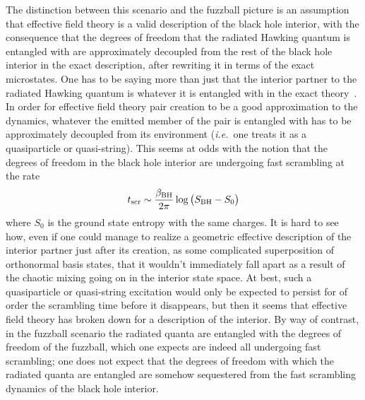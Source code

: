 \documentclass[11pt]{article}
\newcommand{\rcite}{\cite}
\def\BH{{\rm BH}}
\def\ie{{i.e.}}
\def\be{\begin{equation}}
\def\ee{\end{equation}}
\numberwithin{equation}{section}
\def\ie{{\it i.e.}}
\def\ie{{\it i.e.}}
\begin{document}
The distinction between this scenario and the fuzzball picture is an assumption that effective field theory is a valid description of the black hole interior, with the consequence that the degrees of freedom that the radiated Hawking quantum is entangled with are approximately decoupled from the rest of the black hole interior in the exact description, after rewriting it in terms of the exact microstates.  One has to be saying more than just that the interior partner to the radiated Hawking quantum is whatever it is entangled with in the exact theory~\rcite{Guo:2021blh}.  In order for effective field theory pair creation to be a good approximation to the dynamics, whatever the emitted member of the pair is entangled with has to be approximately decoupled from its environment (\ie\ one treats it as a quasiparticle or quasi-string).  This seems at odds with the notion that the degrees of freedom in the black hole interior are undergoing fast scrambling at the rate
\be
t_{\rm scr} \sim \frac{\beta_\BH}{2\pi} \log\big(S_\BH-S_0\big)  
\ee
where $S_0$ is the ground state entropy with the same charges.  It is hard to see how, even if one could manage to realize a geometric effective description of the interior partner just after its creation, as some complicated superposition of orthonormal basis states, that it wouldn't immediately fall apart as a result of the chaotic mixing going on in the interior state space.  At best, such a quasiparticle or quasi-string excitation would only be expected to persist for of order the scrambling time before it disappears, but then it seems that effective field theory has broken down for a description of the interior.
By way of contrast, in the fuzzball scenario the radiated quanta are entangled with the degrees of freedom of the fuzzball, which one expects are indeed all undergoing fast scrambling; one does not expect that the degrees of freedom with which the radiated quanta are entangled are somehow sequestered from the fast scrambling dynamics of the black hole interior.  

\end{document}
